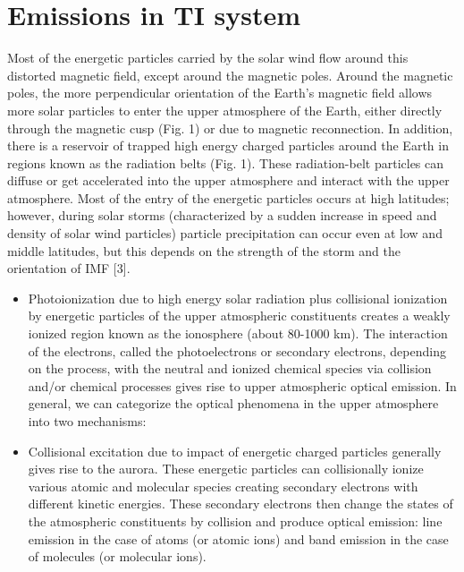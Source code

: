 \section{Emissions in TI system}
Most of the energetic particles carried by the solar wind flow around this distorted magnetic field, except around the magnetic poles. Around the magnetic poles, the more perpendicular orientation of the Earth’s magnetic field allows more solar particles to enter the upper atmosphere of the Earth, either directly through the magnetic cusp (Fig. 1) or due to magnetic reconnection. In addition, there is a reservoir of trapped high energy charged particles around the Earth in regions known as the radiation belts (Fig. 1). These radiation-belt particles can diffuse or get accelerated into the upper atmosphere and interact with the upper atmosphere. Most of the entry of the energetic particles occurs at high latitudes; however, during solar storms (characterized by a sudden increase in speed and density of solar wind particles) particle precipitation can occur even at low and middle latitudes, but this depends on the strength of the storm and the orientation of IMF [3]. 
\begin{itemize}
  \item Photoionization due to high energy solar radiation plus collisional ionization by energetic particles of the upper atmospheric constituents creates a weakly ionized region known as the ionosphere (about 80-1000 km). The interaction of the electrons, called the photoelectrons or secondary electrons, depending on the process, with the neutral and ionized chemical species via collision and/or chemical processes gives rise to upper atmospheric optical emission. In general, we can categorize the optical phenomena in the upper atmosphere into two mechanisms: 

	\item  Collisional excitation due to impact of energetic charged particles generally gives rise to the aurora. These energetic particles can collisionally ionize various atomic and molecular species creating secondary electrons with different kinetic energies. These secondary electrons then change the states of the atmospheric constituents by collision and produce optical emission: line emission in the case of atoms (or atomic ions) and band emission in the case of molecules (or molecular ions). 
\end{itemize}


